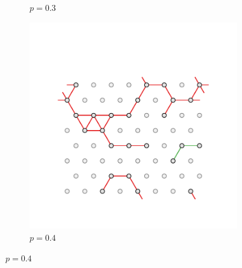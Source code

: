 \begin{figure}[bt]
\begin{subfigure}[b]{0.3\textwidth}
         \caption{$p=0.3$}
         \label{fig:perctri3}
     \end{subfigure}
     \hfill
      \begin{subfigure}[b]{0.3\textwidth}
         \centering
         \includegraphics[width=\textwidth]{./figures/targeted_opt/perc_tri_4.pdf}
         \caption{$p=0.4$}
         \label{fig:perctri4}
     \end{subfigure}
     \hfill
     

\end{figure}
